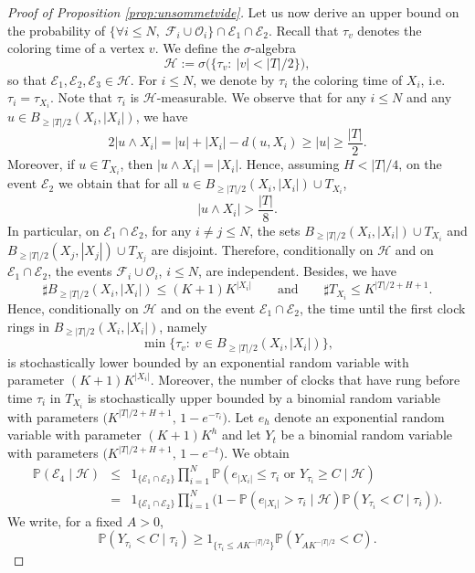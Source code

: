 \documentclass[french]{article}
\renewcommand{\P}{\mathbb{P}}
\newcommand{\Tf}{T}
\renewcommand{\1}{\mathds{1}}
\begin{document}
\begin{proof}[Proof of Proposition \ref{prop:unsommetvide}]
Let us now derive an upper bound on the probability of
$\{\forall i \le N,\; \mathcal{F}_i \cup \mathcal{O}_i\}\cap \mathcal{E}_1\cap \mathcal{E}_2$.
Recall that $\tau_v$ denotes the coloring time of a vertex $v$. We define the $\sigma$-algebra
$$
\mathcal{H}
:= \sigma\bigl(\{\tau_v:\ |v|<|\Tf|/2\}\bigr),
$$
so that $\mathcal{E}_1,\mathcal{E}_2,\mathcal{E}_3 \in \mathcal{H}$. For $i\le N$, we denote by
$\tau_i$ the coloring time of $X_i$, i.e. $\tau_i=\tau_{X_i}$. Note that $\tau_i$ is $\mathcal{H}$-measurable.
We observe that for any $i\le N$ and any $u\in B_{\ge |\Tf|/2}(X_i,|X_i|)$, we have
$$
2|u\wedge X_i|
= |u| + |X_i| - d(u,X_i)
\ge |u|
\ge \frac{|\Tf|}{2}.
$$
Moreover, if $u\in \Tf_{X_i}$, then $|u\wedge X_i|=|X_i|$. Hence, assuming $H<|\Tf|/4$, on the event $\mathcal{E}_2$ we obtain that for all
$u\in B_{\ge |\Tf|/2}(X_i,|X_i|)\cup \Tf_{X_i}$,
$$
|u\wedge X_i|>\frac{|\Tf|}{8}.
$$
In particular, on $\mathcal{E}_1 \cap \mathcal{E}_2$, for any $i\neq j \le N$, the sets
$B_{\ge |\Tf|/2}(X_i,|X_i|)\cup \Tf_{X_i}$ and
$B_{\ge |\Tf|/2}(X_j,|X_j|)\cup \Tf_{X_j}$
are disjoint. Therefore, conditionally on $\mathcal{H}$ and on $\mathcal{E}_1 \cap \mathcal{E}_2$, the events $\mathcal{F}_i \cup \mathcal{O}_i$, $i\le N$, are independent. Besides, we have
$$
\sharp B_{\ge |\Tf|/2}(X_i, |X_i|) \le (K+1)K^{|X_i|}
\qquad \text{and} \qquad
\sharp\Tf_{X_i} \le K^{|\Tf|/2+H+1}.
$$
Hence, conditionally on $\mathcal{H}$ and on the event $\mathcal{E}_1 \cap \mathcal{E}_2$, the time until the first clock rings in $B_{\ge |\Tf|/2}(X_i, |X_i|)$,
namely
\[
\min\{\tau_v:\ v\in B_{\ge |\Tf|/2}(X_i, |X_i|)\},
\]
is stochastically lower bounded by an exponential random variable with parameter $(K+1)K^{|X_i|}$. Moreover, the number of clocks that have rung before time $\tau_i$ in $\Tf_{X_i}$ is stochastically upper bounded by a binomial random variable with parameters $\bigl(K^{|\Tf|/2+H+1},\, 1-e^{-\tau_i}\bigr)$. Let $e_h$ denote an exponential random variable with parameter $(K+1)K^{h}$ and let $Y_t$ be a binomial random variable with parameters $\bigl(K^{|\Tf|/2+H+1},\, 1-e^{-t}\bigr)$. We obtain
\begin{eqnarray*}
\P(\mathcal{E}_4\mid \mathcal{H})&\le& 1_{\{\mathcal{E}_1\cap \mathcal{E}_2\}} \prod_{i=1}^N\P(e_{|X_i|}\le \tau_i \mbox{ or } Y_{\tau_i}\ge C \mid \mathcal{H})\\
&=& 1_{\{\mathcal{E}_1\cap \mathcal{E}_2\}} \prod_{i=1}^N\Big(1-\P(e_{|X_i|}> \tau_i \mid \mathcal{H})\P( Y_{\tau_i}<C \mid \tau_i)\Big).\end{eqnarray*}
We write, for a fixed $A>0$,
$$\P( Y_{\tau_i}<C \mid \tau_i)\ge 1_{\{\tau_i\le A K^{-|\Tf|/2}\}}\P(Y_{A K^{-|\Tf|/2}}<C).$$

\end{proof}
\end{document}
